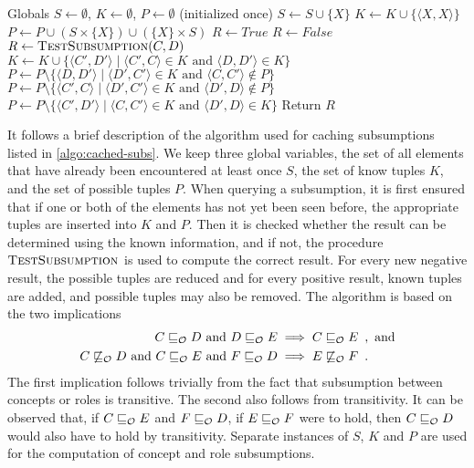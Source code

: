 \begin{algorithm}[ht]
  \begin{algorithmic}
    \State Globals \enspace $S \gets \emptyset$, \enspace $K \gets \emptyset$, \enspace $P \gets \emptyset$ \quad (initialized once)
      \State $S \gets S \cup \{ X \}$
      \State $K \gets K \cup \{ \langle X, X \rangle \}$
      \State $P \gets P \cup ( S \times \{ X \} ) \cup ( \{ X \} \times S )$
    \EndFor
      \State $R \gets \mathit{True}$
      \State $R \gets \mathit{False}$
    \Else
      \State $R \gets \textsc{TestSubsumption}(C, D)$
        \State $K \gets K \cup \{ \langle C', D' \rangle \mid \langle C', C \rangle \in K \text{ and } \langle D, D' \rangle \in K \}$
        \State $P \gets P \setminus \{ \langle D, D' \rangle \mid \langle D', C' \rangle \in K \text{ and } \langle C, C' \rangle \not\in P \}$
        \State $P \gets P \setminus \{ \langle C', C \rangle \mid \langle D', C' \rangle \in K \text{ and } \langle D', D \rangle \not\in P \}$
      \Else
        \State $P \gets P \setminus \{ \langle C', D' \rangle \mid \langle C, C' \rangle \in K \text{ and } \langle D', D \rangle \in K \}$
      \EndIf
    \EndIf
    \State Return $R$
  \end{algorithmic}
  \caption{$\textsc{CachedTestSubsumption}(C, D)$}
  \label{algo:cached-subs}
\end{algorithm}

It follows a brief description of the algorithm used for caching subsumptions listed in \cref{algo:cached-subs}. We keep three global variables, the set of all elements that have already been encountered at least once $S$, the set of know tuples $K$, and the set of possible tuples $P$. When querying a subsumption, it is first ensured that if one or both of the elements has not yet been seen before, the appropriate tuples are inserted into $K$ and $P$. Then it is checked whether the result can be determined using the known information, and if not, the procedure $\textsc{TestSubsumption}$ is used to compute the correct result. For every new negative result, the possible tuples are reduced and for every positive result, known tuples are added, and possible tuples may also be removed. The algorithm is based on the two implications
\begin{align*}
  C \sqsubseteq_\mathcal{O} D \text{ and } D \sqsubseteq_\mathcal{O} E &\implies C \sqsubseteq_\mathcal{O} E \enspace,\text{ and} \\
  C \not\sqsubseteq_\mathcal{O} D \text{ and } C \sqsubseteq_\mathcal{O} E \text{ and } F \sqsubseteq_\mathcal{O} D &\implies E \not\sqsubseteq_\mathcal{O} F \enspace.
\end{align*}
The first implication follows trivially from the fact that subsumption between concepts or roles is transitive. The second also follows from transitivity. It can be observed that, if $C \sqsubseteq_\mathcal{O} E$ and $F \sqsubseteq_\mathcal{O} D$, if $E \sqsubseteq_\mathcal{O} F$ were to hold, then $C \sqsubseteq_\mathcal{O} D$ would also have to hold by transitivity. Separate instances of $S$, $K$ and $P$ are used for the computation of concept and role subsumptions.


